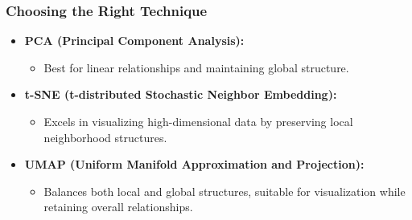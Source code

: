 \documentclass[aspectratio=169]{beamer}
\begin{document}
\begin{frame}[fragile]
    \frametitle{Choosing the Right Technique}
    \begin{itemize}
        \item \textbf{PCA (Principal Component Analysis):} 
        \begin{itemize}
            \item Best for linear relationships and maintaining global structure.
        \end{itemize}
        
        \item \textbf{t-SNE (t-distributed Stochastic Neighbor Embedding):} 
        \begin{itemize}
            \item Excels in visualizing high-dimensional data by preserving local neighborhood structures.
        \end{itemize}

        \item \textbf{UMAP (Uniform Manifold Approximation and Projection):} 
        \begin{itemize}
            \item Balances both local and global structures, suitable for visualization while retaining overall relationships.
        \end{itemize}
    \end{itemize}
\end{frame}
\end{document}
